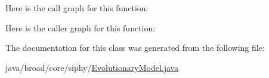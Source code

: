Here is the call graph for this function\+:




Here is the caller graph for this function\+:




The documentation for this class was generated from the following file\+:\begin{DoxyCompactItemize}
\item 
java/broad/core/siphy/\hyperlink{_evolutionary_model_8java}{Evolutionary\+Model.\+java}\end{DoxyCompactItemize}
